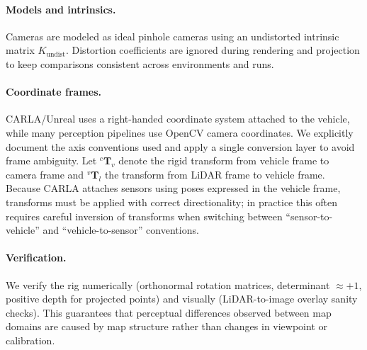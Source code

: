 \paragraph{Models and intrinsics.}
Cameras are modeled as ideal pinhole cameras using an undistorted intrinsic matrix $K_{\text{undist}}$.
Distortion coefficients are ignored during rendering and projection to keep comparisons consistent across environments and runs.

\paragraph{Coordinate frames.}
CARLA/Unreal uses a right-handed coordinate system attached to the vehicle, while many perception pipelines use OpenCV camera coordinates.
We explicitly document the axis conventions used and apply a single conversion layer to avoid frame ambiguity.
Let $^{c}\mathbf{T}_{v}$ denote the rigid transform from vehicle frame to camera frame and $^{v}\mathbf{T}_{l}$ the transform from LiDAR frame to vehicle frame.
Because CARLA attaches sensors using poses expressed in the vehicle frame, transforms must be applied with correct directionality; in practice this often requires careful inversion of transforms when switching between ``sensor-to-vehicle'' and ``vehicle-to-sensor'' conventions.

\paragraph{Verification.}
We verify the rig numerically (orthonormal rotation matrices, determinant $\approx +1$, positive depth for projected points) and visually (LiDAR-to-image overlay sanity checks).
This guarantees that perceptual differences observed between map domains are caused by map structure rather than changes in viewpoint or calibration.




